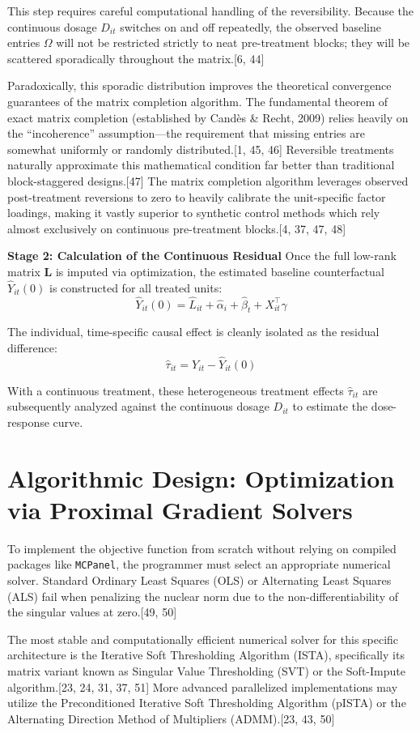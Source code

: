 \documentclass{article}
\begin{document}
This step requires careful computational handling of the reversibility. Because the continuous dosage $D_{it}$ switches on and off repeatedly, the observed baseline entries $\Omega$ will not be restricted strictly to neat pre-treatment blocks; they will be scattered sporadically throughout the matrix.[6, 44] 

Paradoxically, this sporadic distribution improves the theoretical convergence guarantees of the matrix completion algorithm. The fundamental theorem of exact matrix completion (established by Candès \& Recht, 2009) relies heavily on the ``incoherence'' assumption---the requirement that missing entries are somewhat uniformly or randomly distributed.[1, 45, 46] Reversible treatments naturally approximate this mathematical condition far better than traditional block-staggered designs.[47] The matrix completion algorithm leverages observed post-treatment reversions to zero to heavily calibrate the unit-specific factor loadings, making it vastly superior to synthetic control methods which rely almost exclusively on continuous pre-treatment blocks.[4, 37, 47, 48]

\textbf{Stage 2: Calculation of the Continuous Residual}
Once the full low-rank matrix $\mathbf{L}$ is imputed via optimization, the estimated baseline counterfactual $\hat{Y}_{it}(0)$ is constructed for all treated units:
$$\hat{Y}_{it}(0) = \hat{L}_{it} + \hat{\alpha}_i + \hat{\beta}_t + X_{it}^\top \hat{\gamma}$$

The individual, time-specific causal effect is cleanly isolated as the residual difference:
$$\hat{\tau}_{it} = Y_{it} - \hat{Y}_{it}(0)$$

With a continuous treatment, these heterogeneous treatment effects $\hat{\tau}_{it}$ are subsequently analyzed against the continuous dosage $D_{it}$ to estimate the dose-response curve.

\section{Algorithmic Design: Optimization via Proximal Gradient Solvers}

To implement the objective function from scratch without relying on compiled packages like \texttt{MCPanel}, the programmer must select an appropriate numerical solver. Standard Ordinary Least Squares (OLS) or Alternating Least Squares (ALS) fail when penalizing the nuclear norm due to the non-differentiability of the singular values at zero.[49, 50] 

The most stable and computationally efficient numerical solver for this specific architecture is the Iterative Soft Thresholding Algorithm (ISTA), specifically its matrix variant known as Singular Value Thresholding (SVT) or the Soft-Impute algorithm.[23, 24, 31, 37, 51] More advanced parallelized implementations may utilize the Preconditioned Iterative Soft Thresholding Algorithm (pISTA) or the Alternating Direction Method of Multipliers (ADMM).[23, 43, 50]
\end{document}
